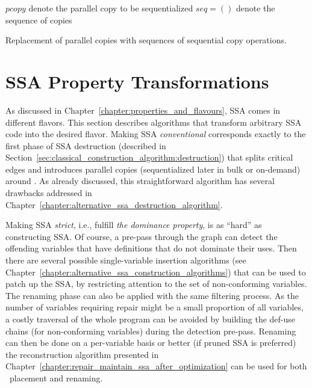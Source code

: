 {\begin{algorithm}[h]
    \Let $\textit{pcopy}$ denote the parallel copy to be sequentialized\;
    \Let $\textit{seq}=()$ denote the sequence of copies\;
\caption{\label{alg:ssadestruction:sequentialization}Replacement of
  parallel copies with sequences of sequential copy operations.}
\end{algorithm}



\section{SSA Property Transformations}
\label{section:classical_construction_algorithm:turning}
As discussed in Chapter~\ref{chapter:properties_and_flavours}, SSA comes in different flavors. 
This section describes algorithms that transform arbitrary SSA code into the desired flavor. 
Making SSA \emph{conventional} corresponds exactly to the first phase of SSA destruction (described in Section~\ref{sec:classical_construction_algorithm:destruction}) that splits critical edges and introduces parallel copies (sequentialized later in bulk or on-demand) around \phifuns. 
As already discussed, this straightforward algorithm has several drawbacks addressed in Chapter~\ref{chapter:alternative_ssa_destruction_algorithm}.

Making SSA \emph{strict}, i.e., fulfill \emph{the dominance property}, is as ``hard'' as constructing SSA. 
Of course, a pre-pass through the graph can detect the offending variables that have definitions that do not dominate their uses. 
Then there are several possible single-variable \phifun insertion algorithms (see Chapter~\ref{chapter:alternative_ssa_construction_algorithms}) that can be used to patch up the SSA, by restricting attention to the set of non-conforming variables. 
The renaming phase can also be applied with the same filtering process. 
As the number of variables requiring repair might be a small proportion of all variables, a costly traversal of the whole program can be avoided by building the def-use chains (for non-conforming variables) during the detection pre-pass. 
Renaming can then be done on a per-variable basis or better (if pruned SSA is preferred) the reconstruction algorithm presented in Chapter~\ref{chapter:repair_maintain_ssa_after_optimization} can be used for both \phifuns\ placement and renaming.


}
